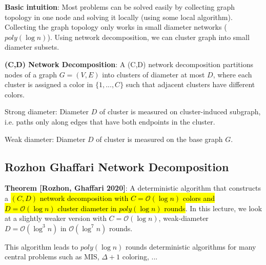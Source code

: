 \documentclass[a4paper, 8pt, landscape]{scrartcl}
\begin{document}
\begin{multicols*}{3}
\textbf{Basic intuition}: Most problems can be solved easily by collecting graph topology in one node and solving it locally (using some local algorithm). Collecting the graph topology only works in small diameter networks ($poly(\log n)$). Using network decomposition, we can cluster graph into small diameter subsets.

\textbf{(C,D) Network Decomposition}: A (C,D) network decomposition partitions nodes of a graph $G=(V,E)$ into clusters of diameter at most $D$, where each cluster is assigned a color in $\{1,...,C\}$ such that adjacent clusters have different colors.

\begin{compactitem}
\item Strong diameter: Diameter $D$ of cluster is measured on cluster-induced subgraph, i.e. paths only along edges that have both endpoints in the cluster.
\item Weak diameter: Diameter $D$ of cluster is measured on the base graph $G$.
\end{compactitem}

\subsection{Rozhon Ghaffari Network Decomposition}

\textbf{Theorem [Rozhon, Ghaffari 2020]}: A deterministic algorithm that constructs a \hl{$(C,D)$ network decomposition with $C=\mathcal{O}(\log n)$ colors and $D=\mathcal{O}(\log n)$ cluster diameter in $poly(\log n)$ rounds}. In this lecture, we look at a slightly weaker version with $C=\mathcal{O}(\log n)$, weak-diameter $D=\mathcal{O}(\log^3 n)$ in $\mathcal{O}(\log^7 n)$ rounds.

This algorithm leads to $poly(\log n)$ rounds deterministic algorithms for many central problems such as MIS, $\Delta+1$ coloring, ...


\end{multicols*}
\end{document}
